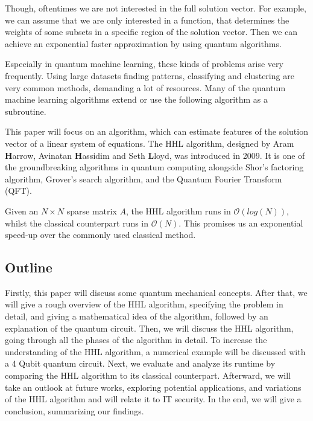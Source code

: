 Though, oftentimes we are not interested in the full solution vector. 
For example, we can assume that we are only interested in a function, that determines the weights of some subsets in a specific region of the solution vector.
Then we can achieve an exponential faster approximation by using quantum algorithms. 


Especially in quantum machine learning, these kinds of problems arise very frequently. 
Using large datasets finding patterns, classifying and clustering are very common methods, demanding a lot of resources. 
Many of the quantum machine learning algorithms extend or use the following algorithm as a subroutine. 

This paper will focus on an algorithm, which can estimate features of the solution vector of a linear system of equations.
The HHL algorithm, designed by Aram \textbf{H}arrow, Avinatan \textbf{H}assidim and Seth \textbf{L}loyd, was introduced in 2009. 
It is one of the groundbreaking algorithms in quantum computing alongside Shor's factoring algorithm, Grover's search algorithm, and the Quantum Fourier Transform (QFT).

Given an $N \times N$ sparse matrix $A$, the HHL algorithm runs in $\mathcal{O} (log (N))$, whilst the classical counterpart runs in $\mathcal{O} (N)$.
This promises us an exponential speed-up over the commonly used classical method.

\subsection{Outline}
Firstly, this paper will discuss some quantum mechanical concepts.
After that, we will give a rough overview of the HHL algorithm, specifying the problem in detail, and giving a mathematical idea of the algorithm, followed by an explanation of the quantum circuit.
Then, we will discuss the HHL algorithm, going through all the phases of the algorithm in detail. 
To increase the understanding of the HHL algorithm, a numerical example will be discussed with a 4 Qubit quantum circuit.
Next, we evaluate and analyze its runtime by comparing the HHL algorithm to its classical counterpart. 
Afterward, we will take an outlook at future works, exploring potential applications, and variations of the HHL algorithm and will relate it to IT security. 
In the end, we will give a conclusion, summarizing our findings. 


